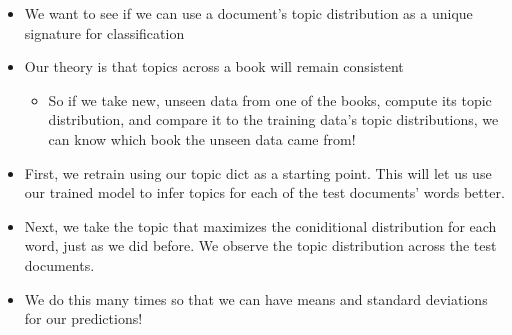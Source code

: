 \documentclass{article}
\begin{document}
    \begin{itemize}
\itemsep1pt\parskip0pt
\item
  We want to see if we can use a document's topic distribution as a
  unique signature for classification
\item
  Our theory is that topics across a book will remain consistent

  \begin{itemize}
  \itemsep1pt\parskip0pt
  \item
    So if we take new, unseen data from one of the books, compute its
    topic distribution, and compare it to the training data's topic
    distributions, we can know which book the unseen data came from!
  \end{itemize}
\item
  First, we retrain using our topic dict as a starting point. This will
  let us use our trained model to infer topics for each of the test
  documents' words better.
\item
  Next, we take the topic that maximizes the coniditional distribution
  for each word, just as we did before. We observe the topic
  distribution across the test documents.
\item
  We do this many times so that we can have means and standard
  deviations for our predictions!
\end{itemize}
\end{document}
